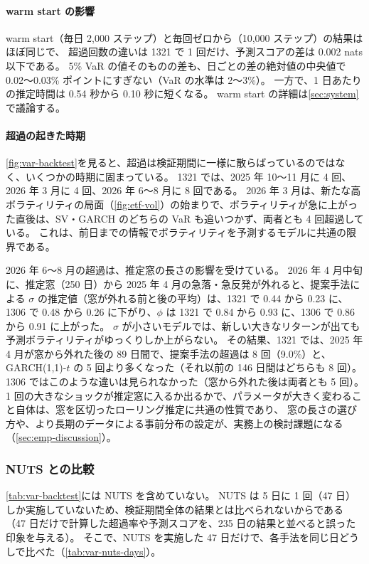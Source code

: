 \paragraph{warm start の影響}
warm start（毎日 2,000 ステップ）と毎回ゼロから（10,000 ステップ）の結果はほぼ同じで、
超過回数の違いは 1321 で 1 回だけ、予測スコアの差は 0.002 nats 以下である。
5\% VaR の値そのものの差も、日ごとの差の絶対値の中央値で 0.02〜0.03\% ポイントにすぎない（VaR の水準は 2〜3\%）。
一方で、1 日あたりの推定時間は 0.54 秒から 0.10 秒に短くなる。
warm start の詳細は\cref{sec:system}で議論する。

\paragraph{超過の起きた時期}
\cref{fig:var-backtest}を見ると、超過は検証期間に一様に散らばっているのではなく、いくつかの時期に固まっている。
1321 では、2025 年 10〜11 月に 4 回、2026 年 3 月に 4 回、2026 年 6〜8 月に 8 回である。
2026 年 3 月は、新たな高ボラティリティの局面（\cref{fig:etf-vol}）の始まりで、ボラティリティが急に上がった直後は、SV・GARCH のどちらの VaR も追いつかず、両者とも 4 回超過している。
これは、前日までの情報でボラティリティを予測するモデルに共通の限界である。

2026 年 6〜8 月の超過は、推定窓の長さの影響を受けている。
2026 年 4 月中旬に、推定窓（250 日）から 2025 年 4 月の急落・急反発が外れると、提案手法による $\sigma$ の推定値（窓が外れる前と後の平均）は、1321 で 0.44 から 0.23 に、1306 で 0.48 から 0.26 に下がり、$\phi$ は 1321 で 0.84 から 0.93 に、1306 で 0.86 から 0.91 に上がった。
$\sigma$ が小さいモデルでは、新しい大きなリターンが出ても予測ボラティリティがゆっくりしか上がらない。
その結果、1321 では、2025 年 4 月が窓から外れた後の 89 日間で、提案手法の超過は 8 回（9.0\%）と、GARCH(1,1)-$t$ の 5 回より多くなった（それ以前の 146 日間はどちらも 8 回）。
1306 ではこのような違いは見られなかった（窓から外れた後は両者とも 5 回）。
1 回の大きなショックが推定窓に入るか出るかで、パラメータが大きく変わること自体は、窓を区切ったローリング推定に共通の性質であり、
窓の長さの選び方や、より長期のデータによる事前分布の設定が、実務上の検討課題になる（\cref{sec:emp-discussion}）。

\subsubsection{NUTS との比較}

\cref{tab:var-backtest}には NUTS を含めていない。
NUTS は 5 日に 1 回（47 日）しか実施していないため、検証期間全体の結果とは比べられないからである
（47 日だけで計算した超過率や予測スコアを、235 日の結果と並べると誤った印象を与える）。
そこで、NUTS を実施した 47 日だけで、各手法を同じ日どうしで比べた（\cref{tab:var-nuts-days}）。


